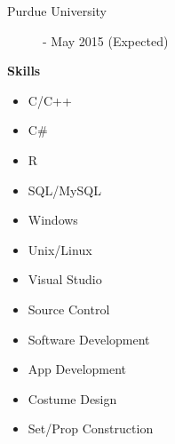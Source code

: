 \documentclass[11pt]{article}
\begin{document}
	\begin{minipage}{0.95\linewidth}
	\begin{center}
		\begin{description}
		\item[Purdue University] - May 2015 (Expected)
		\end{description}
	\end{center}
	\end{minipage}

	\begin{flushleft}
		\textbf{Skills}
		\hrulefill
	\end{flushleft}
	
		\begin{minipage}{0.28\linewidth}
			\begin{itemize}
			\itemsep0em
				\item C/C++
				\item C\#
				\item R
				\item SQL/MySQL
			\end{itemize}
		\end{minipage}
		\hfill
		\begin{minipage}{0.28\linewidth}
			\begin{itemize}
			\itemsep0em
				\item Windows
				\item Unix/Linux
				\item Visual Studio
				\item Source Control
			\end{itemize}
		\end{minipage}
		\hfill
		\begin{minipage}{0.34\linewidth}
			\begin{itemize}
			\itemsep0em
				\item Software Development
				\item App Development
				\item Costume Design
				\item Set/Prop Construction
			\end{itemize}
		\end{minipage}	
\end{document}
